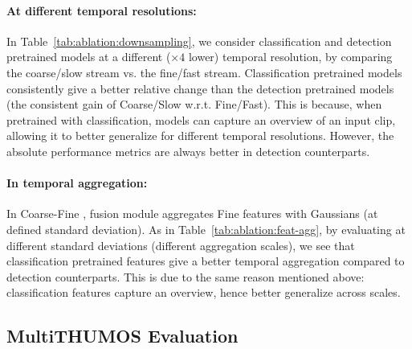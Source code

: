 \documentclass[10pt,twocolumn,letterpaper]{article}
\newcommand{\tref}[1]{Table~\ref{#1}}
\begin{document}
\vspace{-1.0mm}
\paragraph{At different temporal resolutions:} In \tref{tab:ablation:downsampling}, we consider classification and detection pretrained models at a different ($\times 4$ lower) temporal resolution, by comparing the coarse/slow stream vs. the fine/fast stream. Classification pretrained models consistently give a better relative change than the detection pretrained models (the consistent gain of Coarse/Slow w.r.t. Fine/Fast). This is because, when pretrained with classification, models can capture an overview of an input clip, allowing it to better generalize for different temporal resolutions. However, the absolute performance metrics are always better in detection counterparts.

\vspace{-1.0mm}
\paragraph{In temporal aggregation:} In Coarse-Fine \cite{kahatapitiya2021coarse}, fusion module aggregates Fine features with Gaussians (at defined standard deviation). As in \tref{tab:ablation:feat-agg}, by evaluating at different standard deviations (different aggregation scales), we see that classification pretrained features give a better temporal aggregation compared to detection counterparts. This is due to the same reason mentioned above: classification features capture an overview, hence better generalize across scales.


\subsection{MultiTHUMOS Evaluation}
\label{subsec:multithumos}
\end{document}
